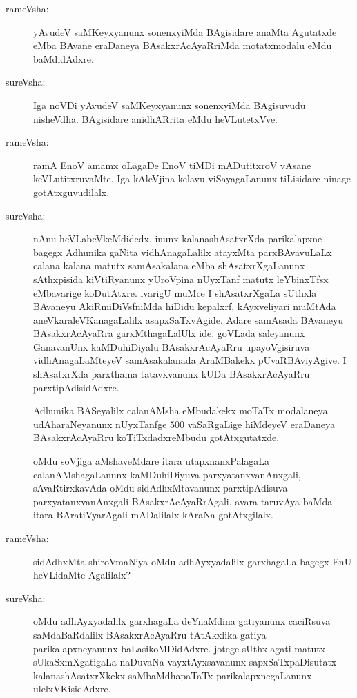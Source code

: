 \begin{description}
\item[rameVsha:] yAvudeV saMKeyxyanunx sonenxyiMda BAgisidare anaMta Agutatxde eMba BAvane eraDaneya BAsakxrAcAyaRriMda motatxmodalu eMdu baMdidAdxre.

\item[sureVsha:] Iga noVDi yAvudeV saMKeyxyanunx sonenxyiMda BAgisuvudu nisheVdha. BAgisidare anidhARrita eMdu heVLutetxVve.

\item[rameVsha:] ramA EnoV amamx oLagaDe EnoV tiMDi mADutitxroV vAsane keVLutitxruvaMte. Iga kAleVjina kelavu viSayagaLanunx tiLisidare ninage gotAtxguvudilalx.

\item[sureVsha:] nAnu heVLabeVkeMdidedx. inunx kalanashAsatxrXda parikalapxne bagegx Adhunika gaNita vidhAnagaLalilx atayxMta parxBAvavuLaLx calana kalana matutx samAsakalana eMba shAsatxrXgaLanunx sAthxpisida kiVtiRyanunx yUroVpina nUyxTanf matutx leYbinxTfsx eMbavarige koDutAtxre. ivarigU muMce I shAsatxrXgaLa sUthxla BAvaneyu AkiRmiDiVsfniMda hiDidu kepalxrf, kAyxveliyari muMtAda aneVkara\break leVKanagaLalilx asapxSaTxvAgide. Adare samAsada BAvaneyu BAsakxrA\break\-cAyaRra garxMthagaLalUlx ide. goVLada saleyanunx GanavanUnx kaMDu\-hiDiyalu BAsakxrAcAyaRru upayoVgisiruva vidhAnagaLaMteyeV samAsakalanada AraMBakekx pUvaRBAviyAgive. I shAsatxrXda parxthama tatavxvanunx kUDa BAsakxrAcAyaRru parxtipAdisidAdxre.


Adhunika BASeyalilx calanAMsha eMbudakekx moTaTx modalaneya udA\-haraNeyanunx nUyxTanfge $500$ vaSaRgaLige hiMdeyeV eraDaneya BAsakxrAcAyaRru koTiTxdadxreMbudu gotAtxgutatxde.

oMdu soVjiga aMshaveMdare itara utapxnanxPalagaLa calanAMshagaLanunx kaMDuhiDiyuva parxyatanxvanAnxgali, sAvaRtirxkavAda oMdu sidAdhxMtavanunx parxtipAdisuva parxyatanxvanAnxgali BAsakxrAcAyaRrAgali, avara taruvAya baMda itara BAratiVyarAgali mADalilalx kAraNa gotAtxgilalx.

\item[rameVsha:] sidAdhxMta shiroVmaNiya oMdu adhAyxyadalilx garxhagaLa bagegx EnU heVLidaMte Agalilalx?

\item[sureVsha:] oMdu adhAyxyadalilx garxhagaLa deYnaMdina gatiyanunx caciRsuva saMdaBaR\-dalilx BAsakxrAcAyaRru tAtAkxlika gatiya parikalapxneyanunx baLasikoMDidAdxre. jotege sUthxlagati matutx sUkaSxmXgatigaLa naDuvaNa vayxtAyxsavanunx sapxSaTxpaDisutatx kalanashAsatxrXkekx saMbaMdhapaTaTx parikalapxnegaLanunx ulelxVKisidAdxre.


\end{description}
